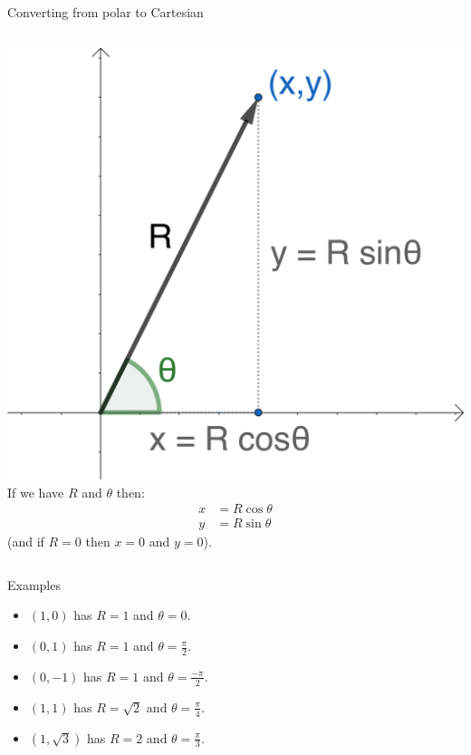 \documentclass{beamer}
\begin{document}
\begin{frame}{Converting from polar to Cartesian}
\begin{columns}
\includegraphics[scale=0.55]{polar-form.png}
If we have $R$ and $\theta$ then:
\begin{align*}
	x &= R \cos\theta\\
	y &= R \sin\theta
\end{align*}
(and if $R=0$ then $x=0$ and $y=0$).\vspace{0.5cm}
\end{columns}
\end{frame}

\begin{frame}{Examples}
\begin{example}
\begin{itemize}
	\item $(1, 0)$ has $R=1$ and $\theta = 0$.
	\item $(0,1)$ has $R=1$ and $\theta = \frac{\pi}{2}$.
	\item $(0,-1)$ has $R=1$ and $\theta = \frac{-\pi}{2}$.
	\item $(1, 1)$ has $R = \sqrt{2}$ and $\theta = \frac{\pi}{4}$.
	\item $(1, \sqrt{3})$ has $R=2$ and $\theta = \frac{\pi}{3}$.
\end{itemize}
\end{example}
\end{frame}
\end{document}
